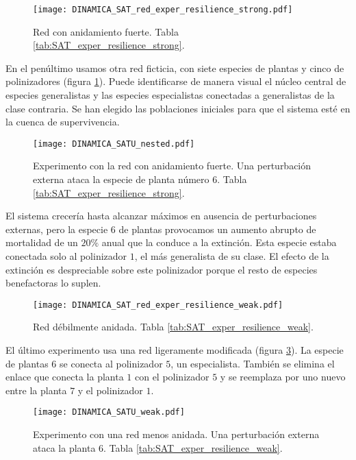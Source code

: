 \begin{figure}[h!]
\centering
\texttt{[image: DINAMICA\_SAT\_red\_exper\_resilience\_strong.pdf]}
\caption {Red con anidamiento fuerte. Tabla \ref{tab:SAT_exper_resilience_strong}.}
\label{fig:DINAMICA_SAT_red_exper_resilience_strong}
\end{figure}

En el penúltimo usamos otra red ficticia, con siete especies de plantas y cinco de polinizadores (figura \ref{fig:DINAMICA_SAT_red_exper_resilience_strong}). Puede identificarse de manera visual el núcleo central de especies generalistas y las especies especialistas conectadas a generalistas de la clase contraria. Se han elegido las poblaciones iniciales para que el sistema esté en la cuenca de supervivencia.

\begin{figure}[h!]
\centering
\texttt{[image: DINAMICA\_SATU\_nested.pdf]}
\caption {Experimento con la red con anidamiento fuerte. Una perturbación externa ataca la especie de planta número $6$. Tabla \ref{tab:SAT_exper_resilience_strong}.}
\label{fig:DINAMICA_SAT_exper_resilience_strong}
\end{figure}

El sistema crecería hasta alcanzar máximos en ausencia de perturbaciones externas, pero la especie $6$ de plantas provocamos un aumento abrupto de mortalidad de un $20\%$ anual que la conduce a la extinción. Esta especie estaba conectada solo al polinizador $1$, el más generalista de su clase. El efecto de la extinción es despreciable sobre este polinizador porque el resto de especies benefactoras lo suplen. 

\begin{figure}[h!]
\centering
\texttt{[image: DINAMICA\_SAT\_red\_exper\_resilience\_weak.pdf]}
\caption {Red débilmente anidada. Tabla \ref{tab:SAT_exper_resilience_weak}.}
\label{fig:DINAMICA_SAT_red_exper_resilience_weak}
\end{figure}

El último experimento usa una red ligeramente modificada (figura  \ref{fig:DINAMICA_SAT_red_exper_resilience_weak}). La especie de plantas $6$ se conecta al polinizador $5$, un especialista. También se elimina el enlace que conecta la planta $1$ con el polinizador $5$ y se reemplaza por uno nuevo entre la planta $7$ y el polinizador $1$.  

\begin{figure}[ht!]
\centering
\texttt{[image: DINAMICA\_SATU\_weak.pdf]}
\caption {Experimento con una red menos anidada. Una perturbación externa ataca la planta $6$. Tabla \ref{tab:SAT_exper_resilience_weak}.}
\label{fig:DINAMICA_SAT_exper_resilience_weak}
\end{figure}

